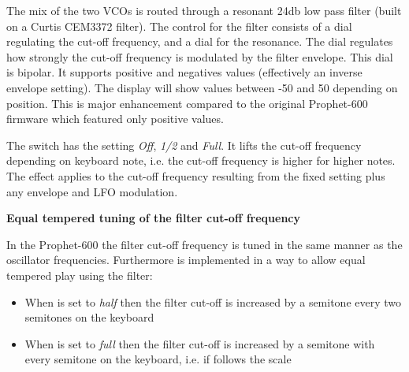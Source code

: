 The mix of the two VCOs is routed through a resonant 24db low pass filter (built on a Curtis CEM3372 filter). The control for the filter consists of a \filtercutoff dial regulating the cut-off frequency, and a \filterres dial for the resonance. The \filterenv dial regulates how strongly the cut-off frequency is modulated by the filter envelope. This dial is bipolar. It supports positive and negatives values (effectively an inverse envelope setting). The display will show values between -50 and 50 depending on position. This is major enhancement compared to the original Prophet-600 firmware which  featured only positive values.

\begin{center}
\end{center}

The \keyboardtrack switch has the setting \textit{Off}, \textit{1/2} and \textit{Full}. It lifts the cut-off frequency depending on keyboard note, i.e. the cut-off frequency is higher for higher notes. The effect applies to the cut-off frequency resulting from the fixed \filtercutoff setting plus any envelope and LFO modulation.  

\textbf{Equal tempered tuning of the filter cut-off frequency}

In the Prophet-600 the filter cut-off frequency is tuned in the same manner as the oscillator frequencies. Furthermore \keyboardtrack is implemented in a way to allow equal tempered play using the filter:

\begin{itemize}
  \item When \keyboardtrack is set to \textit{half} then the filter cut-off is increased by a semitone every two semitones on the keyboard 
  \item When \keyboardtrack is set to \textit{full} then the filter cut-off is increased by a semitone with every semitone on the keyboard, i.e. if follows the scale 
\end{itemize}

